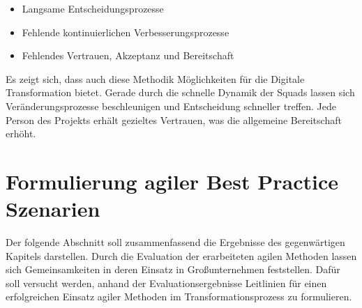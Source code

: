  \begin{itemize}[noitemsep, topsep=0pt]
 	\item Langsame Entscheidungsprozesse
 	\item Fehlende kontinuierlichen Verbesserungsprozesse
 	\item Fehlendes Vertrauen, Akzeptanz und Bereitschaft
 \end{itemize}

Es zeigt sich, dass auch diese Methodik Möglichkeiten für die Digitale Transformation bietet. Gerade durch die schnelle Dynamik der Squads lassen sich Veränderungsprozesse beschleunigen und Entscheidung schneller treffen. Jede Person des Projekts erhält gezieltes Vertrauen, was die allgemeine Bereitschaft erhöht.

\section{Formulierung agiler Best Practice Szenarien}



Der folgende Abschnitt soll zusammenfassend die Ergebnisse des gegenwärtigen Kapitels darstellen. Durch die Evaluation der erarbeiteten agilen Methoden lassen sich Gemeinsamkeiten in deren Einsatz in Großunternehmen feststellen. Dafür soll versucht werden, anhand der Evaluationsergebnisse Leitlinien für einen erfolgreichen Einsatz agiler Methoden im Transformationsprozess zu formulieren.

\todots


